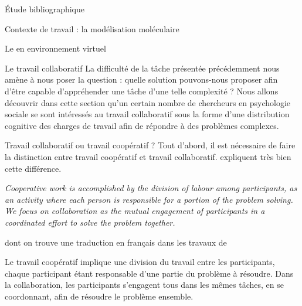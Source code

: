 \documentclass[myfrancais,ngerman,english,frenchb]{mythesis}
\begin{document}
\begin{mychapter}{Étude bibliographique}
\begin{mysection}{Contexte de travail : la modélisation moléculaire}
\begin{mysubsection}{Le  en environnement virtuel}
				\begin{myfigure}
				\end{myfigure}
			\end{mysubsection}
		\end{mysection}
		\begin{mysection}{Le travail collaboratif}
			La difficulté de la tâche présentée précédemment nous amène à nous poser la question : quelle solution pouvons-nous proposer afin d'être capable d'appréhender une tâche d'une telle complexité ?
			Nous allons découvrir dans cette section qu'un certain nombre de chercheurs en psychologie sociale se sont intéressés au travail collaboratif sous la forme d'une distribution cognitive des charges de travail afin de répondre à des problèmes complexes.
			\begin{mysubsection}{Travail collaboratif ou travail coopératif ?}
				Tout d'abord, il est nécessaire de faire la distinction entre travail coopératif et travail collaboratif.
				 expliquent très bien cette différence.
				\begin{myquote}[english]
					\it Cooperative work is accomplished by the division of labour among participants, as an activity where each person is responsible for a portion of the problem solving.
					We focus on collaboration as the mutual engagement of participants in a coordinated effort to solve the problem together.
				\end{myquote}
				dont on trouve une traduction en français dans les travaux de 
				\begin{myquote}[frenchb]
					Le travail coopératif implique une division du travail entre les participants, chaque participant étant responsable d’une partie du problème à résoudre.
					Dans la collaboration, les participants s’engagent tous dans les mêmes tâches, en se coordonnant, afin de résoudre le problème ensemble.
				\end{myquote}


\end{mysubsection}
\end{mysection}
\end{mychapter}
\end{document}
